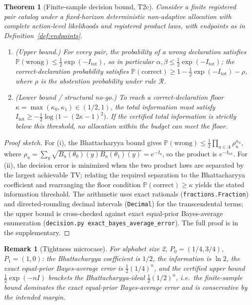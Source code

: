 \documentclass[11pt]{article}
\newtheorem{theorem}{Theorem}
\newtheorem{remark}{Remark}
\begin{document}
\begin{theorem}[Finite-sample decision bound, T2c]\label{thm:t2c}
Consider a finite registered pair catalog under a fixed-horizon deterministic non-adaptive allocation
with complete action-level likelihoods and registered product laws, with endpoints as in
Definition~\ref{def:endpoints}.
\begin{enumerate}[nosep]
  \item \emph{(Upper bound.)} For every pair, the probability of a wrong declaration satisfies
        $\mathbb{P}(\mathrm{wrong})\le \tfrac12\exp(-I_{\mathrm{tot}})$, so in particular
        $\alpha,\beta\le\tfrac12\exp(-I_{\mathrm{tot}})$; the correct-declaration probability satisfies
        $\mathbb{P}(\mathrm{correct})\ge 1-\tfrac12\exp(-I_{\mathrm{tot}})-\rho$, where $\rho$ is the
        abstention probability under rule $\mathcal{R}$.
  \item \emph{(Lower bound / structural no-go.)} To reach a correct-declaration floor
        $\kappa=\max(\kappa_0,\kappa_1)\in(1/2,1)$, the total information must satisfy
        $I_{\mathrm{tot}}\ge -\tfrac12\log\!\bigl(1-(2\kappa-1)^2\bigr)$. If the certified total
        information is strictly below this threshold, no allocation within the budget can meet the
        floor.
\end{enumerate}
\end{theorem}

\begin{proof}[Proof sketch]
For (i), the Bhattacharyya bound gives
$\mathbb{P}(\mathrm{wrong})\le\tfrac12\prod_{u\in A}\rho_u^{n_u}$, where
$\rho_u=\sum_y\sqrt{B_u(\theta_0)(y)B_u(\theta_1)(y)}=e^{-I_u}$, so the product is
$e^{-I_{\mathrm{tot}}}$. For (ii), the decision error is minimized when the two product laws are
separated by the largest achievable TV; relating the required separation to the Bhattacharyya coefficient
and rearranging the floor condition $\mathbb{P}(\mathrm{correct})\ge\kappa$ yields the stated
information threshold. The arithmetic uses exact rationals (\texttt{fractions.Fraction}) and
directed-rounding decimal intervals (\texttt{Decimal}) for the transcendental terms; the upper bound is
cross-checked against exact equal-prior Bayes-average enumeration
(\texttt{decision.py exact\_bayes\_average\_error}). The full
proof is in the supplementary.
\end{proof}

\begin{remark}[Tightness microcase]\label{rem:tight}
For alphabet size 2, $P_0=(1/4,3/4)$, $P_1=(1,0)$: the Bhattacharyya coefficient is $1/2$, the
information is $\ln2$, the exact equal-prior Bayes-average error is $\tfrac12(1/4)^n$, and the certified upper bound
$\tfrac12\exp(-nI)$ brackets the Bhattacharyya-ideal $\tfrac12(1/2)^n$, i.e.\ the finite-sample bound
dominates the exact equal-prior Bayes-average error and is conservative by the intended margin.
\end{remark}
\end{document}

